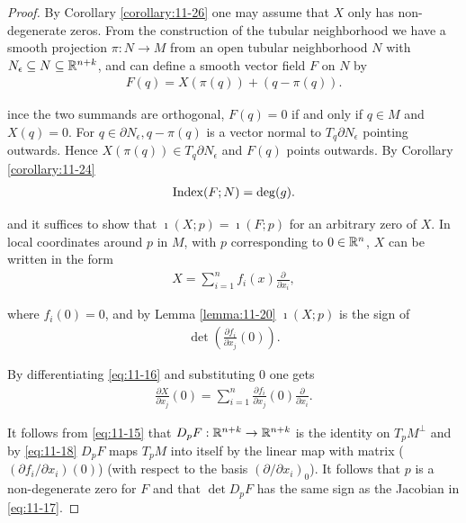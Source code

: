 \begin{proof}
  By Corollary \ref{corollary:11-26} one may assume that $X$ only has non-degenerate zeros.
From the construction of the tubular neighborhood we have a smooth projection
$\pi: N\to M$ from an open tubular neighborhood $N$ with $N_\epsilon\subseteq N\subseteq \mathbb{R}^{n+k}$, and 
can define a smooth vector field $F$ on $N$ by
\begin{align}\label{eq:11-15}
  F(q) = X(\pi(q)) + (q - \pi(q)).
\end{align}

ince the two summands are orthogonal, $F(q) = 0$ if and only if $q\in M$ and
$X(q) = 0$. For $q\in\partial N_\epsilon, q-\pi(q)$ is a vector normal to $T_q\partial N_\epsilon$ 
pointing outwards. Hence $X(\pi(q))\in T_q\partial N_\epsilon$ and $F(q)$ points outwards. 
By Corollary \ref{corollary:11-24} 
\begin{align*}
  \mathrm{Index}(F; N) = \mathrm{deg}(g).
\end{align*}

and it suffices to show that $\imath(X; p) = \imath(F; p)$ for an arbitrary zero of $X$. In 
local coordinates around $p$ in $M$, with $p$ corresponding to $0\in\mathbb{R}^n$, $X$ can be written
in the form
\begin{align}\label{eq:11-16}
  X = \sum_{i=1}^{n}{f_i(x) \frac{\partial }{\partial x_i }},
\end{align}

where $f_i(0) = 0$, and by Lemma \ref{lemma:11-20} $\imath(X; p)$ is the sign of 
\begin{align}\label{eq:11-17}
  \det\left(\frac{\partial f_i }{\partial x_j }(0)\right).
\end{align}

By differentiating \eqref{eq:11-16} and substituting 0 one gets
\begin{align}\label{eq:11-18}
  \frac{\partial X }{\partial x_j }(0) 
  = \sum_{i=1 }^{n }{\frac{\partial f_i }{\partial x_j }(0) \frac{\partial }{\partial x_i }}.
\end{align}

It follows from \eqref{eq:11-15} that $D_pF:\mathbb{R}^{n+k}\to\mathbb{R}^{n+k}$ is the identity 
on $T_pM^\perp$ and by \eqref{eq:11-18} $D_pF$ maps $T_pM$ into itself by the linear map with 
matrix ($(\partial f_i/\partial x_i)(0)$) (with respect to the basis $(\partial/\partial x_i)_0$). 
It follows that $p$ is a non-degenerate zero for $F$ and that $\det D_pF$ has the same sign as 
the Jacobian in \eqref{eq:11-17}.
\end{proof}